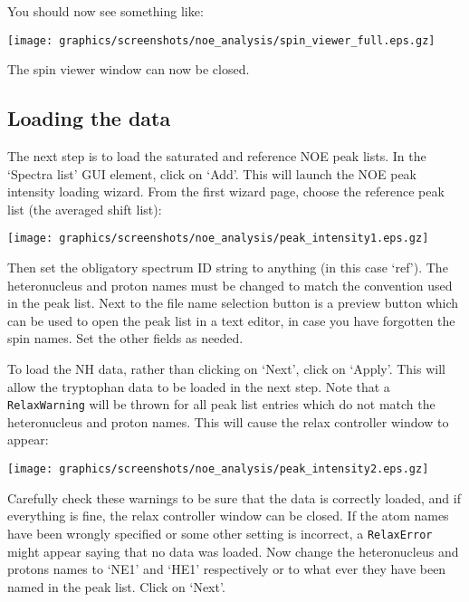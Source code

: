You should now see something like:

\begin{minipage}[h]{\linewidth}
\centerline{\texttt{[image: graphics/screenshots/noe\_analysis/spin\_viewer\_full.eps.gz]}}
\end{minipage}

The spin viewer window can now be closed.



\subsection{Loading the data}

The next step is to load the saturated and reference NOE peak lists.  In the `Spectra list' GUI element, click on `Add'.  This will launch the NOE peak intensity loading wizard.  From the first wizard page, choose the reference peak list (the averaged shift list):

\begin{minipage}[h]{\linewidth}
\centerline{\texttt{[image: graphics/screenshots/noe\_analysis/peak\_intensity1.eps.gz]}}
\end{minipage}

Then set the obligatory spectrum ID string to anything (in this case `ref').  The heteronucleus and proton names must be changed to match the convention used in the peak list.  Next to the file name selection button is a preview button which can be used to open the peak list in a text editor, in case you have forgotten the spin names.  Set the other fields as needed.

To load the NH data, rather than clicking on `Next', click on `Apply'.  This will allow the tryptophan data to be loaded in the next step.  Note that a \texttt{RelaxWarning} will be thrown for all peak list entries which do not match the heteronucleus and proton names.  This will cause the relax controller window to appear:

\begin{minipage}[h]{\linewidth}
\centerline{\texttt{[image: graphics/screenshots/noe\_analysis/peak\_intensity2.eps.gz]}}
\end{minipage}

Carefully check these warnings to be sure that the data is correctly loaded, and if everything is fine, the relax controller window can be closed.  If the atom names have been wrongly specified or some other setting is incorrect, a \texttt{RelaxError} might appear saying that no data was loaded.  Now change the heteronucleus and protons names to `NE1' and `HE1' respectively or to what ever they have been named in the peak list.  Click on `Next'.

